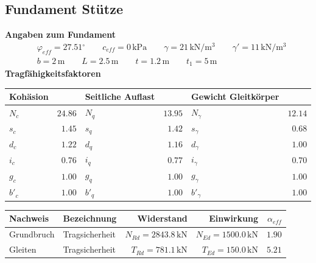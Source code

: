 \documentclass[11pt,a4paper]{article}
\begin{document}
\subsection{Fundament Stütze}
\noindent\textbf{Angaben zum Fundament}
\begin{equation*}
\begin{aligned} & \varphi_{eff} = 27.51{}^{\circ} \qquad c_{eff} = 0\,\mathrm{kPa} \qquad \gamma = 21\,\mathrm{kN}/\mathrm{m}^{3} \qquad \gamma' = 11\,\mathrm{kN}/\mathrm{m}^{3} \\ & b = 2\,\mathrm{m} \qquad L = 2.5\,\mathrm{m} \qquad t = 1.2\,\mathrm{m} \qquad t_1 = 5\,\mathrm{m} \end{aligned}
\end{equation*}
\noindent\textbf{Tragfähigkeitsfaktoren}
\begin{longtable}{lrlrlr}
\hline
Kohäsion &  & Seitliche Auflast &  & Gewicht Gleitkörper &  \\
\hline
\endhead
$N_{c}$ & $24.86$ & $N_{q}$ & $13.95$ & $N_{\gamma}$ & $12.14$ \\
$s_{c}$ & $1.45$ & $s_{q}$ & $1.42$ & $s_{\gamma}$ & $0.68$ \\
$d_{c}$ & $1.22$ & $d_{q}$ & $1.16$ & $d_{\gamma}$ & $1.00$ \\
$i_{c}$ & $0.76$ & $i_{q}$ & $0.77$ & $i_{\gamma}$ & $0.70$ \\
$g_{c}$ & $1.00$ & $g_{q}$ & $1.00$ & $g_{\gamma}$ & $1.00$ \\
$b'_{c}$ & $1.00$ & $b'_{q}$ & $1.00$ & $b'_{\gamma}$ & $1.00$ \\
\hline
\end{longtable}
\begin{xltabular}{\linewidth}{>{\raggedright\arraybackslash}X>{\raggedright\arraybackslash}Xrrr}
\hline
Nachweis & Bezeichnung & Widerstand & Einwirkung & $\alpha_{eff}$ \\
\hline
\endhead
Grundbruch & Tragsicherheit & $N_{Rd} = 2843.8\,\mathrm{kN}$ & $N_{Ed} = 1500.0\,\mathrm{kN}$ & $1.90$ \\
Gleiten & Tragsicherheit & $T_{Rd} = 781.1\,\mathrm{kN}$ & $T_{Ed} = 150.0\,\mathrm{kN}$ & $5.21$ \\
\hline
\end{xltabular}
\end{document}
